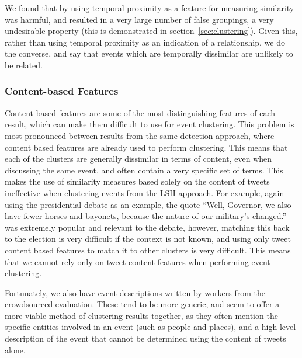 We found that by using temporal proximity as a feature for measuring similarity was harmful, and resulted in a very large number of false groupings, a very undesirable property (this is demonstrated in section~\ref{sec:clustering}).
Given this, rather than using temporal proximity as an indication of a relationship, we do the converse, and say that events which are temporally dissimilar are unlikely to be related.

\subsubsection{Content-based Features}
Content based features are some of the most distinguishing features of each result, which can make them difficult to use for event clustering.
This problem is most pronounced between results from the same detection approach, where content based features are already used to perform clustering.
This means that each of the clusters are generally dissimilar in terms of content, even when discussing the same event, and often contain a very specific set of terms.
This makes the use of similarity measures based solely on the content of tweets  ineffective when clustering events from the LSH approach.
For example, again using the presidential debate as an example, the quote ``Well, Governor, we also have fewer horses and bayonets, because the nature of our military's changed.'' was extremely popular and relevant to the debate, however, matching this back to the election is very difficult if the context is not known, and using only tweet content based features to match it to other clusters is very difficult.
This means that we cannot rely only on tweet content features when performing event clustering.

Fortunately, we also have event descriptions written by workers from the crowdsourced evaluation.
These tend to be more generic, and seem to offer a more viable method of clustering results together, as they often mention the specific entities involved in an event (such as people and places), and a high level description of the event that cannot be determined using the content of tweets alone.

